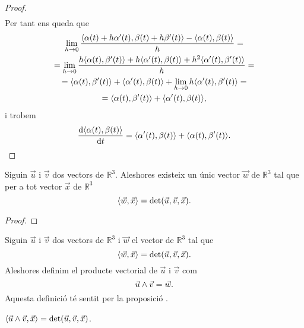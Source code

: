 \documentclass[../Apunts.tex]{subfiles}
\begin{document}
\begin{proposition}
\begin{proof}
\begin{multline*}
			\end{multline*}
			Per tant ens queda que
			\begin{multline*}
				\lim_{h\to0}\frac{\prodesc{\alpha(t)+h\alpha'(t)}{\beta(t)+h\beta'(t)}-\prodesc{\alpha(t)}{\beta(t)}}{h}=\\
				=\lim_{h\to0}\frac{h\prodesc{\alpha(t)}{\beta'(t)}+h\prodesc{\alpha'(t)}{\beta(t)}+h^{2}\prodesc{\alpha'(t)}{\beta'(t)}}{h}=\\
				=\prodesc{\alpha(t)}{\beta'(t)}+\prodesc{\alpha'(t)}{\beta(t)}+\lim_{h\to0}h\prodesc{\alpha'(t)}{\beta'(t)}=\\
				=\prodesc{\alpha(t)}{\beta'(t)}+\prodesc{\alpha'(t)}{\beta(t)},
			\end{multline*}
			i trobem
			\[\frac{\diff\prodesc{\alpha(t)}{\beta(t)}}{\diff t}=\prodesc{\alpha'(t)}{\beta(t)}+\prodesc{\alpha(t)}{\beta'(t)}.\qedhere\]
		\end{proof}
	\end{proposition}
	\begin{proposition}
		\label{prop:unicitat del producte vectorial entre dos vectors}
		Siguin \(\vec{u}\) i \(\vec{v}\) dos vectors de \(\mathbb{R}^{3}\). Aleshores existeix un únic vector \(\vec{w}\) de \(\mathbb{R}^{3}\) tal que per a tot vector \(\vec{x}\) de \(\mathbb{R}^{3}\)
		\[\prodesc{\vec{w}}{\vec{x}}=\det(\vec{u},\vec{v},\vec{x}).\]
		\begin{proof}
		\end{proof}
	\end{proposition}
	\begin{definition}
		\label{def:producte vectorial}
		Siguin \(\vec{u}\) i \(\vec{v}\) dos vectors de \(\mathbb{R}^{3}\) i \(\vec{w}\) el vector de \(\mathbb{R}^{3}\) tal que
		\[\prodesc{\vec{w}}{\vec{x}}=\det(\vec{u},\vec{v},\vec{x}).\]
		Aleshores definim el producte vectorial de \(\vec{u}\) i \(\vec{v}\) com
		\[\vec{u}\mathbin{\wedge}\vec{v}=\vec{w}.\]
		Aquesta definició té sentit per la proposició .
	\end{definition}
	\begin{observation}
		\label{obs:fórmula del determinant segons el producte vectorial i el producte escalar}
		\(\prodesc{\vec{u}\prodvec\vec{v}}{\vec{x}}=\det(\vec{u},\vec{v},\vec{x})\).
	\end{observation}
\end{document}
